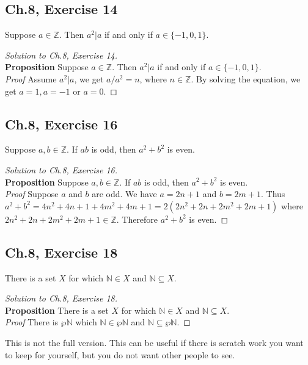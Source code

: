 \documentclass[12pt]{amsart}
\numberwithin{equation}{section}
\theoremstyle{definition}
\theoremstyle{remark}
\newif\ifnotes
\begin{document}
\subsection*{Ch.8, Exercise 14}  Suppose $ a \in \mathbb{Z} $. Then $ a^2 | a $ if and only if $ a \in \{ -1, 0, 1 \} $.

\begin{proof}[Solution to Ch.8, Exercise 14]
\ \\
\textbf{Proposition} Suppose $ a \in \mathbb{Z} $. Then $ a^2 | a $ if and only if $ a \in \{ -1, 0, 1 \} $. \\

\textit{Proof} Assume $ a^2 | a $, we get $ a / a^2 = n $, where $ n \in \mathbb{Z} $. By solving the equation, we get $ a = 1, a = -1 $ or $ a = 0 $.

\end{proof}




\subsection*{Ch.8, Exercise 16}  Suppose $ a, b \in \mathbb{Z} $. If $ ab $ is odd, then $ a^2 + b^2 $ is even.

\begin{proof}[Solution to Ch.8, Exercise 16]
\ \\
\textbf{Proposition} Suppose $ a, b \in \mathbb{Z} $. If $ ab $ is odd, then $ a^2 + b^2 $ is even.\\
\textit{Proof} Suppose $ a $ and $ b $ are odd. We have $ a = 2n + 1 $ and $ b = 2m + 1 $. Thus $ a^2 + b^2 = 4n^2 + 4n + 1 + 4m^2 + 4m + 1 = 2(2n^2 + 2n + 2m^2 + 2m + 1) $ where $ 2n^2 + 2n + 2m^2 + 2m + 1 \in \mathbb{Z} $. Therefore $ a^2 + b^2 $ is even.

\end{proof}




\subsection*{Ch.8, Exercise 18}  There is a set $ X $ for which $ \mathbb{N} \in X $ and $ \mathbb{N} \subseteq X $.

\begin{proof}[Solution to Ch.8, Exercise 18]
\ \\
\textbf{Proposition} There is a set $ X $ for which $ \mathbb{N} \in X $ and $ \mathbb{N} \subseteq X $.\\
\textit{Proof} There is $ \wp \mathbb{N}$ which $ \mathbb{N} \in \wp \mathbb{N} $ and $ \mathbb{N} \subseteq \wp  \mathbb{N} $.

\end{proof}

\ifnotes


\else
	This is not the full version.  This can be useful if there is scratch work you want to keep for yourself, but you do not want other people to see. 
\fi





\end{document}

